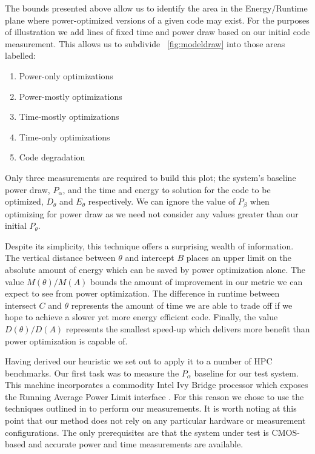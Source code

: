 The bounds presented above allow us to identify the area in the Energy/Runtime plane where power-optimized versions of a given code may exist. For the purposes of illustration we add lines of fixed time and power draw based on our initial code measurement. This allows us to subdivide \figurename~\ref{fig:modeldraw} into those areas labelled:

\begin{enumerate}
\centering
\item Power-only optimizations
\item Power-mostly optimizations
\item Time-mostly optimizations
\item Time-only optimizations
\item Code degradation
\end{enumerate}

Only three measurements are required to build this plot; the system's baseline power draw, $P_\alpha$, and the time and energy to solution for the code to be optimized, $D_\theta$ and $E_\theta$ respectively. We can ignore the value of $P_\beta$ when optimizing for power draw as we need not consider any values greater than our initial $P_\theta$.

Despite its simplicity, this technique offers a surprising wealth of information. The vertical distance between $\theta$ and intercept $B$ places an upper limit on the absolute amount of energy which can be saved by power optimization alone. The value $M(\theta) / M(A)$ bounds the amount of improvement in our metric we can expect to see from power optimization. The difference in runtime between intersect $C$ and $\theta$ represents the amount of time we are able to trade off if we hope to achieve a slower yet more energy efficient code. Finally, the value $D(\theta) / D(A)$ represents the smallest speed-up which delivers more benefit than power optimization is capable of.


Having derived our heuristic we set out to apply it to a number of HPC benchmarks. Our first task was to measure the $P_\alpha$ baseline for our test system. This machine incorporates a commodity Intel Ivy Bridge processor which exposes the Running Average Power Limit interface \cite{david:2010aa}. For this reason we chose to use the techniques outlined in \cite{hackenberg:2013aa} to perform our measurements. It is worth noting at this point that our method does not rely on any particular hardware or measurement configurations. The only prerequisites are that the system under test is CMOS-based and accurate power and time measurements are available.

